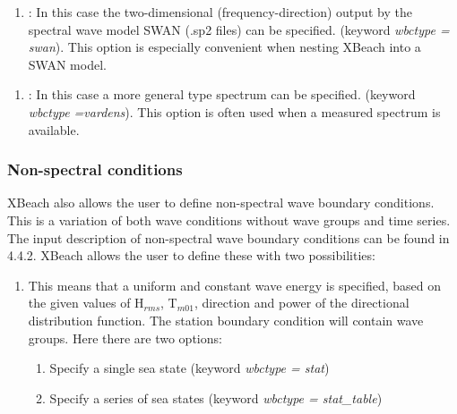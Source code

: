 \documentclass{article}
\begin{document}
\noindent 

\begin{enumerate}
\item  {}: In this case the two-dimensional (frequency-direction) output by the spectral wave model SWAN (.sp2 files) can be specified. (keyword \textit{wbctype = swan}). This option is especially convenient when nesting XBeach into a SWAN model.
\end{enumerate}

\noindent 

\begin{enumerate}
\item  {}: In this case a more general type spectrum can be specified.  (keyword \textit{wbctype =vardens}). This option is often used when a measured spectrum is available.
\end{enumerate}


\subsubsection{ Non-spectral conditions}

\noindent XBeach also allows the user to define non-spectral wave boundary conditions. This is a variation of both wave conditions without wave groups and time series. The input description of non-spectral wave boundary conditions can be found in 4.4.2. XBeach allows the user to define these with two possibilities:

\noindent 

\begin{enumerate}
\item  {} This means that a uniform and constant wave energy is specified, based on the given values of H${}_{rms}$, T${}_{m01}$, direction and power of the directional distribution function. The station boundary condition will  contain wave groups. Here there are two options:

\begin{enumerate}
\item  Specify a single sea state (keyword \textit{wbctype = stat})

\item  Specify a series of sea states (keyword \textit{wbctype = stat\_table})
\end{enumerate}
\end{enumerate}

\noindent 
\end{document}
